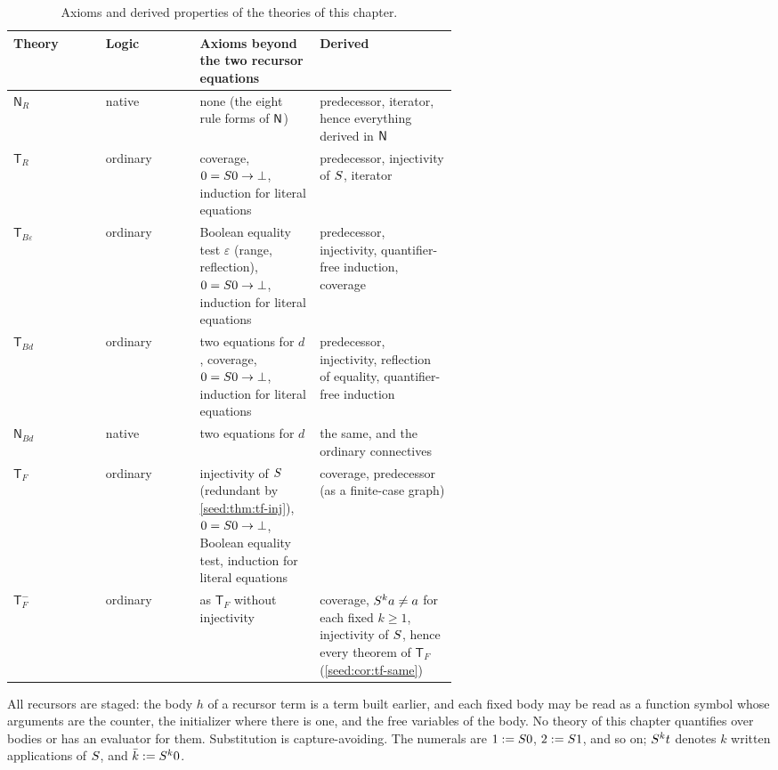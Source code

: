 \begin{table}[ht]
\centering\small
\begin{tabular}{@{}llp{0.27\linewidth}p{0.31\linewidth}@{}}
\toprule
Theory & Logic & Axioms beyond the two recursor equations & Derived\\
\midrule
$\mathsf{N}_R$ & native & none (the eight rule forms of $\mathsf{N}$) &
predecessor, iterator, hence everything derived in $\mathsf{N}$\\
$\mathsf{T}_R$ & ordinary & coverage, $0=S 0\to\bot$, induction for literal
equations & predecessor, injectivity of $S$, iterator\\
$\mathsf{T}_{B\varepsilon}$ & ordinary & Boolean equality test $\varepsilon$
(range, reflection), $0=S 0\to\bot$, induction for literal equations &
predecessor, injectivity, quantifier-free induction, coverage\\
$\mathsf{T}_{Bd}$ & ordinary & two equations for $d$, coverage,
$0=S 0\to\bot$, induction for literal equations & predecessor, injectivity,
reflection of equality, quantifier-free induction\\
$\mathsf{N}_{Bd}$ & native & two equations for $d$ & the same, and the
ordinary connectives\\
$\mathsf{T}_F$ & ordinary & injectivity of $S$ (redundant by
\cref{seed:thm:tf-inj}), $0=S 0\to\bot$, Boolean
equality test, induction for literal equations & coverage, predecessor (as a
finite-case graph)\\
$\mathsf{T}_F^{-}$ & ordinary & as $\mathsf{T}_F$ without injectivity &
coverage, $S^k a\neq a$ for each fixed $k\geq1$, injectivity of $S$,
hence every theorem of $\mathsf{T}_F$ (\cref{seed:cor:tf-same})\\
\bottomrule
\end{tabular}
\caption{Axioms and derived properties of the theories of this chapter.}
\label{seed:tab:hyp}
\end{table}

All recursors are staged: the body $h$ of a recursor term is a term built
earlier, and each fixed body may be read as a function symbol whose arguments
are the counter, the initializer where there is one, and the free variables of
the body. No theory of this chapter quantifies over bodies or has an evaluator
for them. Substitution is capture-avoiding. The numerals are $1\mathrel{:=}S 0$,
$2\mathrel{:=}S 1$, and so on; $S^k t$ denotes $k$ written applications of
$S$, and $\bar k\mathrel{:=}S^k 0$.

